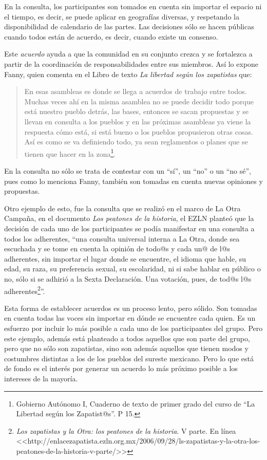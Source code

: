 \documentclass[oneside]{book}
\begin{document}
En la consulta, los participantes son tomados en cuenta sin importar el espacio ni el tiempo, es decir, se puede aplicar en geografías diversas, y respetando la disponibilidad de calendario de las partes. Las decisiones sólo se hacen públicas cuando todos están de acuerdo, es decir, cuando existe un consenso.

Este \textit{acuerdo} ayuda a que la comunidad en su conjunto crezca y se fortalezca a partir de la coordinación de responsabilidades entre sus miembros. Así lo expone Fanny, quien comenta en el Libro de texto \textit{La libertad según los zapatistas} que:

\begin{quote}
En esas asambleas es donde se llega a acuerdos de trabajo entre todos. Muchas veces ahí en la misma asamblea no se puede decidir todo porque está nuestro pueblo detrás, las bases, entonces se sacan propuestas y se llevan en consulta a los pueblos y en las próximas asambleas ya viene la respuesta cómo está, si está bueno o los pueblos propusieron otras cosas. Así es como se va definiendo todo, ya sean reglamentos o planes que se tienen que hacer en la zona\footnote{ Gobierno Autónomo I, Cuaderno de texto de primer grado del curso de “La Libertad según los Zapatist@s”. P 15.}.
\end{quote}

En la consulta no sólo se trata de contestar con un “sí”, un “no” o un “no sé”, pues como lo menciona Fanny, también son tomadas en cuenta nuevas opiniones y propuestas. 
	
Otro ejemplo de esto, fue la consulta que se realizó en el marco de La Otra Campaña, en el documento \textit{Los peatones de la historia}, el EZLN planteó que la decisión de cada uno de los participantes se podía manifestar en una consulta a todos los adherentes, “una consulta universal interna a La Otra, donde sea escuchada y se tome en cuenta la opinión de todo@s y cada un@ de l@s adherentes, sin importar el lugar donde se encuentre, el idioma que hable, su edad, su raza, su preferencia sexual, su escolaridad, ni si sabe hablar en público o no, sólo si se adhirió a la Sexta Declaración.  Una votación, pues, de tod@s l@s adherentes\footnote{\textit{Los zapatistas y la Otra: los peatones de la historia}. V parte. En línea <<http://enlacezapatista.ezln.org.mx/2006/09/28/ls-zapatistas-y-la-otra-los-peatones-de-la-historia-v-parte/>>}”.

Esta forma de establecer acuerdos es un proceso lento, pero sólido. Son tomadas en cuenta todas las voces sin importar en dónde se encuentre cada quien. Es un esfuerzo por incluir lo más posible a cada uno de los participantes del grupo. Pero este ejemplo, además está planteado a todos aquellos que son parte del grupo, pero que no sólo son zapatistas, sino son además aquellos que tienen modos y costumbres distintas a los de los pueblos del sureste mexicano. Pero lo que está de fondo es el interés por generar un acuerdo lo más próximo posible a los intereses de la mayoría.
\end{document}
